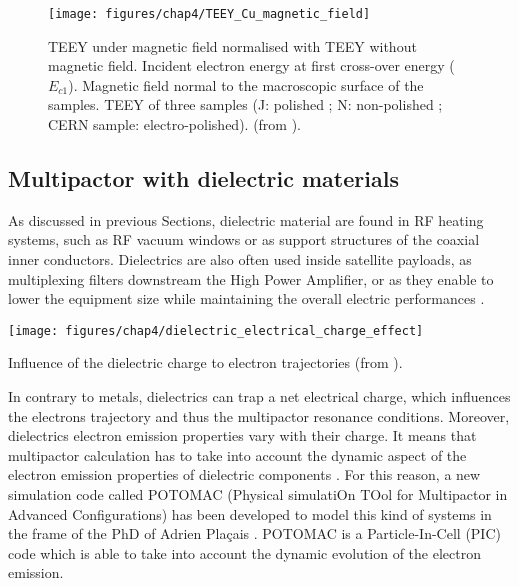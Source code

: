 \begin{figure*}
	\centering
	\texttt{[image: figures/chap4/TEEY\_Cu\_magnetic\_field]}
	\caption{TEEY under magnetic field normalised with TEEY without magnetic field. Incident electron energy at first cross-over energy ($E_{c1}$). Magnetic field normal to the macroscopic surface of the samples. TEEY of three samples (J: polished ; N: non-polished ; CERN sample: electro-polished). (from ).}
	\label{fig:teeycumagneticfield}
\end{figure*}


\subsection[Influence of Dielectric]{Multipactor with dielectric materials} \label{sec:multipactor_dielectric}
As discussed in previous Sections, dielectric material are found in RF heating systems, such as RF vacuum windows or as support structures of the coaxial inner conductors.  Dielectrics are also often used inside satellite payloads, as multiplexing filters downstream the High Power Amplifier, or as they enable to lower the equipment size while maintaining the overall electric performances . 


\begin{marginfigure}
	\centering
	\texttt{[image: figures/chap4/dielectric\_electrical\_charge\_effect]}
	\caption{Influence of the dielectric charge to electron trajectories (from ).}
	\label{fig:dielectricelectricalchargeeffect}
\end{marginfigure}

In contrary to metals, dielectrics can trap a net electrical charge, which influences the electrons trajectory and thus the multipactor resonance conditions. Moreover, dielectrics electron emission properties vary with their charge. It means that multipactor calculation has to take into account the dynamic aspect of the electron emission properties of dielectric components . For this reason, a new simulation code called POTOMAC (Physical simulatiOn TOol for Multipactor in Advanced Configurations) has been developed to model this kind of systems in the frame of the PhD of Adrien Plaçais . POTOMAC is a  Particle-In-Cell (PIC) code which is able to take into account the dynamic evolution of the electron emission. 

